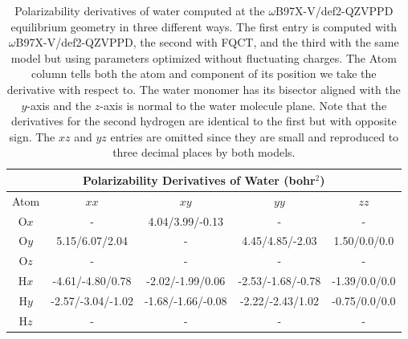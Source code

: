 \documentclass[journal=jctcce,manuscript=article]{achemso}
\begin{document}
\begin{table}[ht!]
  \begin{center}
  \begin{tabular}{ccccc}
      \multicolumn{5}{c}{Polarizability Derivatives of Water (bohr$^2$)} \\\hline
       Atom & $xx$ & $xy$ & $yy$ & $zz$ \\\hline
       O$x$ & -                 & 4.04/3.99/-0.13    & -                  & -  \\
       O$y$ & 5.15/6.07/2.04    & -                  & 4.45/4.85/-2.03    & 1.50/0.0/0.0  \\
       O$z$ & -                 & -                  & -                  & -  \\
       H$x$ & -4.61/-4.80/0.78  & -2.02/-1.99/0.06   & -2.53/-1.68/-0.78  & -1.39/0.0/0.0  \\
       H$y$ & -2.57/-3.04/-1.02 & -1.68/-1.66/-0.08  & -2.22/-2.43/1.02   & -0.75/0.0/0.0  \\
       H$z$ & -                 & -                  & -                  & -  \\\hline
  \end{tabular}
  \end{center}
  \vspace{-3mm}
  \caption{Polarizability derivatives of water computed at the $\omega$B97X-V/def2-QZVPPD equilibrium geometry in three different ways. The first entry is computed with $\omega$B97X-V/def2-QZVPPD, the second with FQCT, and the third with the same model but using parameters optimized without fluctuating charges. The Atom column tells both the atom and component of its position we take the derivative with respect to. The water monomer has its bisector aligned with the $y$-axis and the $z$-axis is normal to the water molecule plane. Note that the derivatives for the second hydrogen are identical to the first but with opposite sign. The $xz$ and $yz$ entries are omitted since they are small and reproduced to three decimal places by both models.}
  \label{tab:pol_derivs}
\end{table}
\end{document}
